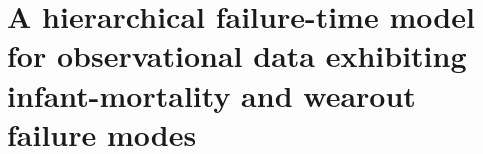 \documentclass{beamer}
\newcommand{\op}{\operatorname}
\begin{document}
\section[failure-time model]{A hierarchical failure-time model for observational data exhibiting infant-mortality and wearout failure modes}
% 
% 
% 
% 
% 
\end{document}
